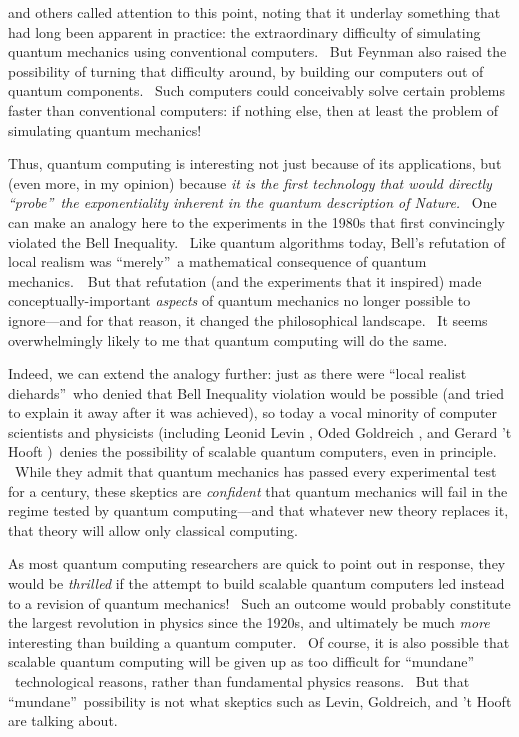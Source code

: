 \documentclass[12pt,onecolumn]{article}%
\begin{document}
\cite{feynman:qc} and others called attention to this point, noting that it
underlay something that had long been apparent in practice: the extraordinary
difficulty of simulating quantum mechanics using conventional computers. \ But
Feynman also raised the possibility of turning that difficulty around, by
building our computers out of quantum components. \ Such computers could
conceivably solve certain problems faster than conventional computers: if
nothing else, then at least the problem of simulating quantum mechanics!

Thus, quantum computing is interesting not just because of its applications,
but (even more, in my opinion) because \textit{it is the first technology that
would directly \textquotedblleft probe\textquotedblright\ the exponentiality
inherent in the quantum description of Nature.} \ One can make an analogy here
to the experiments in the 1980s that first convincingly violated the Bell
Inequality. \ Like quantum algorithms today, Bell's refutation of local
realism was \textquotedblleft merely\textquotedblright\ a mathematical
consequence of quantum mechanics.\ \ But that refutation (and the experiments
that it inspired) made conceptually-important \textit{aspects} of quantum
mechanics no longer possible to ignore---and for that reason, it changed the
philosophical landscape. \ It seems overwhelmingly likely to me that quantum
computing will do the same.

Indeed, we can extend the analogy further: just as there were
\textquotedblleft local realist diehards\textquotedblright\ who denied that
Bell Inequality violation would be possible (and tried to explain it away
after it was achieved), so today a vocal minority of computer scientists and
physicists (including Leonid Levin \cite{levin:qc}, Oded Goldreich
\cite{goldreich:qc}, and Gerard 't Hooft \cite{thooft})\ denies the
possibility of scalable quantum computers, even in principle. \ While they
admit that quantum mechanics has passed every experimental test for a century,
these skeptics are \textit{confident} that quantum mechanics will fail in the
regime tested by quantum computing---and that whatever new theory replaces it,
that theory will allow only classical computing.

As most quantum computing researchers are quick to point out in response, they
would be \textit{thrilled} if the attempt to build scalable quantum computers
led instead to a revision of quantum mechanics! \ Such an outcome would
probably constitute the largest revolution in physics since the 1920s, and
ultimately be much \textit{more} interesting than building a quantum computer.
\ Of course, it is also possible that scalable quantum computing will be given
up as too difficult for \textquotedblleft mundane\textquotedblright%
\ technological reasons, rather than fundamental physics reasons. \ But that
\textquotedblleft mundane\textquotedblright\ possibility is not what skeptics
such as Levin, Goldreich, and 't Hooft are talking about.
\end{document}
